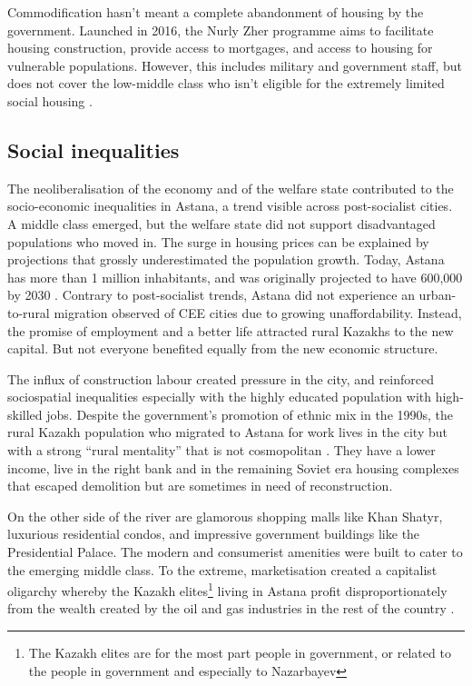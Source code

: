 \documentclass{article}
\begin{document}
Commodification hasn't meant a complete abandonment of housing by the government. Launched in 2016, the Nurly Zher programme aims to facilitate housing construction, provide access to mortgages, and access to housing for vulnerable populations. However, this includes military and government staff, but does not cover the low-middle class who isn't eligible for the extremely limited social housing \parencite{unece2018housing}.

\subsection{Social inequalities}

The neoliberalisation of the economy and of the welfare state contributed to the socio-economic inequalities in Astana, a trend visible across post-socialist cities. A middle class emerged, but the welfare state did not support disadvantaged populations who moved in. The surge in housing prices can be explained by projections that grossly underestimated the population growth. Today, Astana has more than 1 million inhabitants, and was originally projected to have 600,000 by 2030 \parencite{masterplan2001}. Contrary to post-socialist trends, Astana did not experience an urban-to-rural migration observed of CEE cities due to growing unaffordability. Instead, the promise of employment and a better life attracted rural Kazakhs to the new capital. But not everyone benefited equally from the new economic structure.

The influx of construction labour created pressure in the city, and reinforced sociospatial inequalities especially with the highly educated population with high-skilled jobs.
Despite the government's promotion of ethnic mix in the 1990s, the rural Kazakh population who migrated to Astana for work lives in the city but with a strong ``rural mentality'' that is not cosmopolitan \parencite{koch2014bordering}. They have a lower income, live in the right bank and in the remaining Soviet era housing complexes that escaped demolition but are sometimes in need of reconstruction.

On the other side of the river are glamorous shopping malls like Khan Shatyr, luxurious residential condos, and impressive government buildings like the Presidential Palace. The modern and consumerist amenities were built to cater to the emerging middle class. To the extreme, marketisation created a capitalist oligarchy whereby the Kazakh elites\footnote{The Kazakh elites are for the most part people in government, or related to the people in government and especially to Nazarbayev} living in Astana profit disproportionately from the wealth created by the oil and gas industries in the rest of the country \parencite{gallo2021three}.
\end{document}
